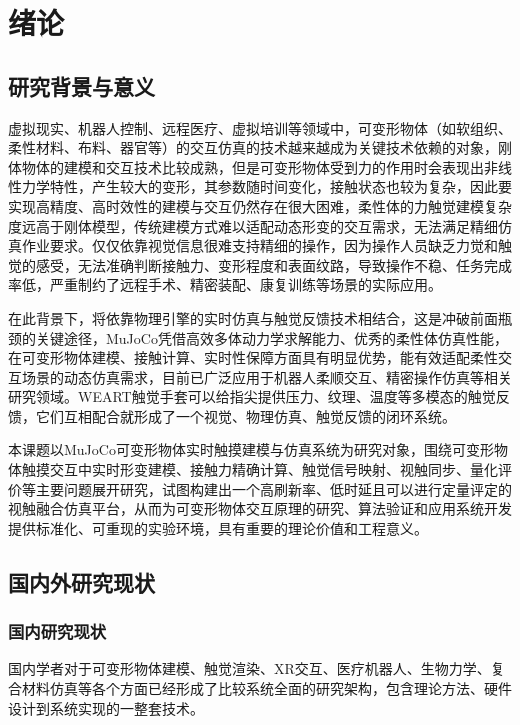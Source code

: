 
\chapter{绪论}

\section{研究背景与意义}

虚拟现实、机器人控制、远程医疗、虚拟培训等领域中，可变形物体（如软组织、柔性材料、布料、器官等）的交互仿真的技术越来越成为关键技术依赖的对象，刚体物体的建模和交互技术比较成熟，但是可变形物体受到力的作用时会表现出非线性力学特性，产生较大的变形，其参数随时间变化，接触状态也较为复杂，因此要实现高精度、高时效性的建模与交互仍然存在很大困难，柔性体的力触觉建模复杂度远高于刚体模型，传统建模方式难以适配动态形变的交互需求，无法满足精细仿真作业要求。\cite{ref32}仅仅依靠视觉信息很难支持精细的操作，因为操作人员缺乏力觉和触觉的感受，无法准确判断接触力、变形程度和表面纹路，导致操作不稳、任务完成率低，严重制约了远程手术、精密装配、康复训练等场景的实际应用\cite{ref31}。

在此背景下，将依靠物理引擎的实时仿真与触觉反馈技术相结合，这是冲破前面瓶颈的关键途径，MuJoCo凭借高效多体动力学求解能力、优秀的柔性体仿真性能，在可变形物体建模、接触计算、实时性保障方面具有明显优势，能有效适配柔性交互场景的动态仿真需求，目前已广泛应用于机器人柔顺交互、精密操作仿真等相关研究领域\cite{ref33}。WEART触觉手套可以给指尖提供压力、纹理、温度等多模态的触觉反馈，它们互相配合就形成了一个视觉、物理仿真、触觉反馈的闭环系统。

本课题以MuJoCo可变形物体实时触摸建模与仿真系统为研究对象，围绕可变形物体触摸交互中实时形变建模、接触力精确计算、触觉信号映射、视触同步、量化评价等主要问题展开研究，试图构建出一个高刷新率、低时延且可以进行定量评定的视触融合仿真平台，从而为可变形物体交互原理的研究、算法验证和应用系统开发提供标准化、可重现的实验环境，具有重要的理论价值和工程意义。

\section{国内外研究现状}

\subsection{国内研究现状}

国内学者对于可变形物体建模、触觉渲染、XR交互、医疗机器人、生物力学、复合材料仿真等各个方面已经形成了比较系统全面的研究架构，包含理论方法、硬件设计到系统实现的一整套技术。

